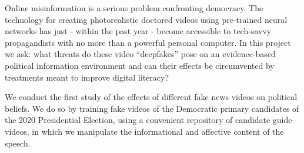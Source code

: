 
Online misinformation is a serious problem confronting democracy. The technology for creating photorealistic doctored videos using pre-trained neural networks has just - within the past year - become accessible to tech-savvy propagandists with no more than a powerful personal computer. In this project we ask: what threats do these video “deepfakes” pose on an evidence-based political information environment and can their effects be circumvented by treatments meant to improve digital literacy?

We conduct the first study of the effects of different fake news videos on political beliefs. We do so by training fake videos of the Democratic primary candidates of the 2020 Presidential Election, using a convenient repository of candidate guide videos, in which we manipulate the informational and affective content of the speech.
